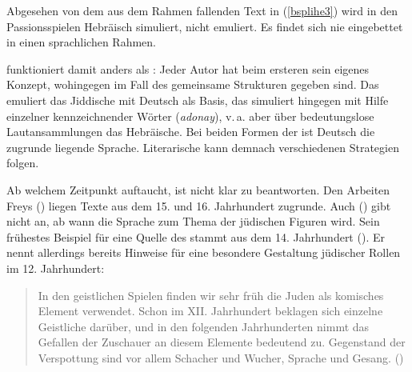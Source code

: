 

Abgesehen von dem aus dem Rahmen fallenden Text in (\ref{bsplihe3}) wird in den Passionsspielen Hebräisch simuliert, nicht emuliert. Es findet sich nie eingebettet in einen sprachlichen Rahmen. 


\hai{{\LiHe}} funktioniert damit anders als \hai{{\LiJi}}: Jeder Autor hat beim ersteren sein eigenes Konzept, wohingegen im Fall des \hai{{\LiJi}} gemeinsame Strukturen gegeben sind. Das \hai{{\LiJi}} emuliert das Jiddische mit Deutsch als Basis, das \hai{{\LiHe}} simuliert hingegen mit Hilfe einzelner kennzeichnender Wörter (\textit{adonay}), v.‏\,a. aber über bedeutungslose Lautansammlungen das Hebräische. Bei beiden Formen der  ist Deutsch die zugrunde liegende Sprache. Literarische  kann demnach verschiedenen Strategien folgen.

Ab welchem Zeitpunkt \hai{{\LiHe}} auftaucht, ist nicht klar zu beantworten. Den Arbeiten Freys (\citeyear{Frey1992,Frey1994}) liegen Texte aus dem 15. und 16. Jahrhundert zugrunde. Auch \citeauthor{Carrington1897} (\citeyear{Carrington1897}) gibt nicht an, ab wann die Sprache zum Thema der jüdischen Figuren wird. Sein frühestes Beispiel für eine Quelle des \hai{{\LiHe}} stammt aus dem 14. Jahrhundert (\citealt[7f]{Carrington1897}). Er nennt allerdings bereits Hinweise für eine besondere Gestaltung jüdischer Rollen im 12. Jahrhundert:
\begin{quote}
In den geistlichen Spielen finden wir sehr früh die Juden als komisches Element verwendet. Schon im XII. Jahrhundert beklagen sich einzelne Geistliche darüber, und in den folgenden Jahrhunderten nimmt das Gefallen der Zuschauer an diesem Elemente bedeutend zu. Gegenstand der Verspottung sind vor allem Schacher und Wucher, Sprache und Gesang. (\citealt[7]{Carrington1897})
\end{quote}

